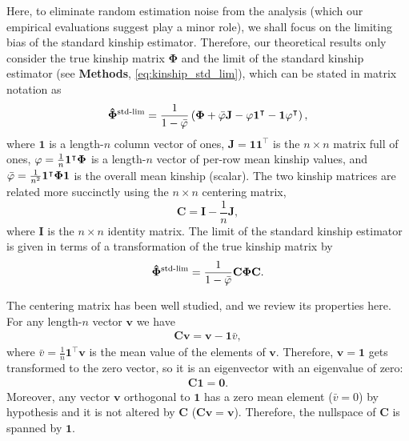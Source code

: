 \documentclass[11pt]{article}
\newcommand{\kinMat}{%
  \ensuremath{%
    \mathbf{\Phi}
  }%
  \xspace%
}%
\newcommand{\kinMatStdLim}{%
  \ensuremath{%
    \mathbf{\hat{\Phi}}^\text{std-lim}
  }%
  \xspace%
}%
\begin{document}
Here, to eliminate random estimation noise from the analysis (which our empirical evaluations suggest play a minor role), we shall focus on the limiting bias of the standard kinship estimator.
Therefore, our theoretical results only consider the true kinship matrix \kinMat and the limit of the standard kinship estimator (see \textbf{Methods}, \cref{eq:kinship_std_lim}), which can be stated in matrix notation as
$$
\kinMatStdLim
=
\frac{1}{1 - \bar{\varphi}}
\left(
  \kinMat
  + \bar{\varphi} \mathbf{J}
  - \mathbf{\varphi} \mathbf{1}^\intercal 
  - \mathbf{1} \mathbf{\varphi}^\intercal 
\right)
,
$$
where
$\mathbf{1}$ is a length-$n$ column vector of ones,
$\mathbf{J} = \mathbf{1} \mathbf{1}^\intercal$ is the $n \times n$ matrix full of ones,
$\mathbf{\varphi} = \frac{1}{n} \mathbf{1}^\intercal \kinMat$ is a length-$n$ vector of per-row mean kinship values, and
$\bar{\varphi} = \frac{1}{n^2} \mathbf{1}^\intercal \kinMat \mathbf{1}$ is the overall mean kinship (scalar).
The two kinship matrices are related more succinctly using the $n \times n$ centering matrix,
$$
\mathbf{C}
=
\mathbf{I} - \frac{1}{n} \mathbf{J},
$$
where $\mathbf{I}$ is the $n \times n$ identity matrix.
The limit of the standard kinship estimator is given in terms of a transformation of the true kinship matrix by
\begin{equation}
  \label{eq:kin-std-lim-C}
  \kinMatStdLim
  =
  \frac{1}{1 - \bar{\varphi}}
  \mathbf{C} \kinMat \mathbf{C}
  .
\end{equation}

The centering matrix has been well studied, and we review its properties here.
For any length-$n$ vector $\mathbf{v}$ we have
\begin{align*}
  \mathbf{C} \mathbf{v}
  =
  \mathbf{v} - \mathbf{1} \bar{v}
  ,
\end{align*}
where $\bar{v} = \frac{1}{n} \mathbf{1}^\intercal \mathbf{v}$ is the mean value of the elements of $\mathbf{v}$.
Therefore, $\mathbf{v} = \mathbf{1}$ gets transformed to the zero vector, so it is an eigenvector with an eigenvalue of zero:
\begin{align*}
  \mathbf{C} \mathbf{1}
  =
  \mathbf{0}
  .
\end{align*}
Moreover, any vector $\mathbf{v}$ orthogonal to $\mathbf{1}$ has a zero mean element ($\bar{v} = 0$) by hypothesis and it is not altered by $\mathbf{C}$ ($\mathbf{C} \mathbf{v} = \mathbf{v}$).
Therefore, the nullspace of $\mathbf{C}$ is spanned by $\mathbf{1}$.
\end{document}
